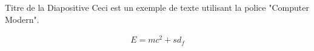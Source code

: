 \documentclass{beamer}
\begin{document}
\begin{frame}{Titre de la Diapositive}
Ceci est un exemple de texte utilisant la police "Computer Modern".

\begin{align*}
E = mc^2+sd_{f}
\end{align*}

\end{frame}
\end{document}
